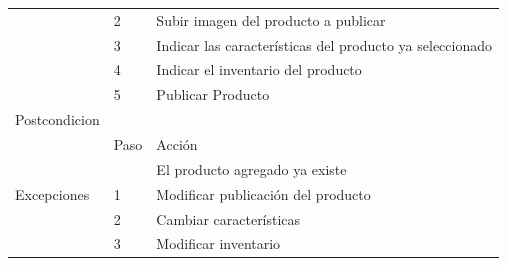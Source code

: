 \begin{table}[th!]
\begin{tabular}{|l|l|l|}
		& 2                                                                           & Subir imagen del producto a publicar                                                                                                \\ \cline{2-3} 
		& 3                                                                           & Indicar las características del producto ya seleccionado                                                                       \\ \cline{2-3} 
		& 4                                                                           & Indicar el inventario del producto                                                                                                  \\ \cline{2-3} 
		& 5                                                                           & Publicar Producto                                                                                                                   \\ \hline
		Postcondicion                                                                & \multicolumn{2}{l|}{}                                                                                                                                                                                             \\ \hline
		\multirow{6}{*}{Excepciones}                                                 & Paso                                                                        & Acción                                                                                                                              \\ \cline{2-3} 
		&                                                                             & El producto agregado ya existe                                                                                                      \\ \cline{2-3} 
		& 1                                                                           & Modificar publicación del producto                                                                                                  \\ \cline{2-3} 
		& 2                                                                           & Cambiar características                                                                                                             \\ \cline{2-3} 
		& 3                                                                           & Modificar inventario                                                                                                                \\ \cline{2-3} 

\end{tabular}
\end{table}
